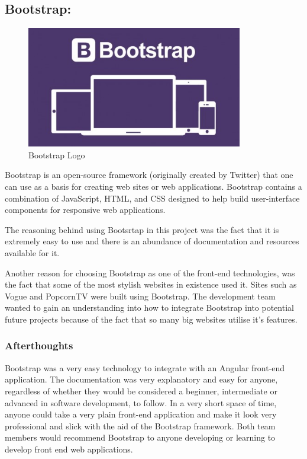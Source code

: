 \subsection{Bootstrap:}
\label{sec:TechnologyReviewBootstrap}

\begin{figure}[H]
    \centering
    \includegraphics[width=\textwidth, height=150pt]{img/BootStrapLogo.PNG}
    \caption{Bootstrap Logo}
    \label{fig:my_label}
\end{figure}

\bigskip

Bootstrap is an open-source framework (originally created by Twitter) that one can use as a basis for creating web sites or web applications. Bootstrap contains a combination of JavaScript, HTML, and CSS designed to help build user-interface components for responsive web applications. 

\bigskip

The reasoning behind using Bootsrtap in this project was the fact that it is extremely easy to use and there is an abundance of documentation and resources available for it.

Another reason for choosing Bootstrap as one of the front-end technologies, was the fact that some of the most stylish websites in existence used it. Sites such as Vogue and PopcornTV were built using Bootstrap.  The development team wanted to gain an understanding into how to integrate Bootstrap into potential future projects because of the fact that so many big websites utilise it's features. 

\bigskip

\subsubsection{Afterthoughts}

Bootstrap was a very easy technology to integrate with an Angular front-end application. The documentation was very explanatory and easy for anyone, regardless of whether they would be considered a beginner, intermediate or advanced in software development, to follow. In a very short space of time, anyone could take a very plain front-end application and make it look very professional and slick with the aid of the Bootstrap framework. Both team members would recommend Bootstrap to anyone developing or learning to develop front end web applications. 


